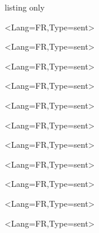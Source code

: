 \documentclass[french,11pt,a4paper]{article}
\begin{document}

\pagebreak

\begin{DemoCode}{listing only}
\begin{EnvtExo}\ipsum<Lang=FR,Type=sent>\end{EnvtExo}%

\begin{EnvtExo}[Trait=pointilles]\ipsum<Lang=FR,Type=sent>\end{EnvtExo}%

\begin{EnvtExo}[Trait=dashilles]\ipsum<Lang=FR,Type=sent>\end{EnvtExo}%

\begin{EnvtExo}[Decoration=Icone/\faPython]\ipsum<Lang=FR,Type=sent>\end{EnvtExo}%

\begin{EnvtExo}[Decoration=Ceinture/rouge]\ipsum<Lang=FR,Type=sent>\end{EnvtExo}%

\begin{EnvtExo}[Decoration=Chrono/20]\ipsum<Lang=FR,Type=sent>\end{EnvtExo}%

\begin{EnvtExo}[Decoration=Image/goku_ssj4]\ipsum<Lang=FR,Type=sent>\end{EnvtExo}%

\begin{EnvtExo}[Decoration=faEtoiles/1.5§4]\ipsum<Lang=FR,Type=sent>\end{EnvtExo}%

\begin{EnvtExo}[Decoration=tkzEtoiles/3.5§5]\ipsum<Lang=FR,Type=sent>\end{EnvtExo}%

\begin{EnvtExo}[Decoration=Barres/V2]\ipsum<Lang=FR,Type=sent>\end{EnvtExo}%

\begin{EnvtExo}[Decoration=Points/7.5]\ipsum<Lang=FR,Type=sent>\end{EnvtExo}%


\end{DemoCode}
\end{document}
